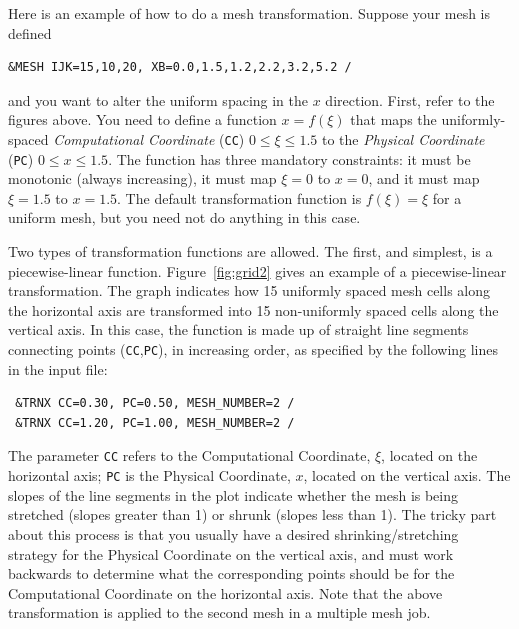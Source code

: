 \documentclass[11pt]{book}
\newcommand{\ct}{\tt\small}
\begin{document}
\noindent
Here is an example of how to do a mesh transformation. Suppose your mesh is defined

\footnotesize
\begin{verbatim}
&MESH IJK=15,10,20, XB=0.0,1.5,1.2,2.2,3.2,5.2 /
\end{verbatim}
\normalsize

\noindent
and you want to alter the uniform spacing in the $x$ direction.
First, refer to the figures above.
You need to define a function $x = f(\xi)$ that maps the uniformly-spaced
{\em Computational Coordinate} ({\ct CC}) $0 \le \xi \le 1.5$
to the {\em Physical Coordinate} ({\ct PC}) $0 \le x \le 1.5$.
The function has three mandatory constraints: it must be monotonic (always increasing),
it must map $\xi=0$ to $x=0$, and it must map $\xi=1.5$ to $x=1.5$.
The default transformation function is $f(\xi) = \xi$ for a uniform mesh, but you need not do
anything in this case.

Two types of transformation functions are allowed. The first, and
simplest, is a piecewise-linear function.
Figure~\ref{fig:grid2} gives an example of a piecewise-linear transformation.
The graph indicates how 15 uniformly spaced mesh cells
along the horizontal axis are transformed into 15 non-uniformly spaced cells along the vertical axis.
In this case, the function is made up of straight line segments
connecting points ({\ct CC},{\ct PC}), in increasing order, as specified by the following lines in the input file:

\footnotesize
\begin{verbatim}
 &TRNX CC=0.30, PC=0.50, MESH_NUMBER=2 /
 &TRNX CC=1.20, PC=1.00, MESH_NUMBER=2 /
\end{verbatim} \normalsize

\noindent
The parameter {\ct CC} refers to the Computational Coordinate, $\xi$, located
on the horizontal axis; {\ct PC} is the Physical Coordinate, $x$, located on
the vertical axis.  The slopes of the
line segments in the plot indicate whether the mesh is being stretched (slopes greater
than 1) or shrunk (slopes less than 1). The tricky part about this
process is that you usually have a desired shrinking/stretching strategy
for the Physical Coordinate on the vertical axis, and must work backwards
to determine what the corresponding points should be for the Computational
Coordinate on the horizontal axis. Note that the above transformation is
applied to the second mesh in a multiple mesh job.
\end{document}
